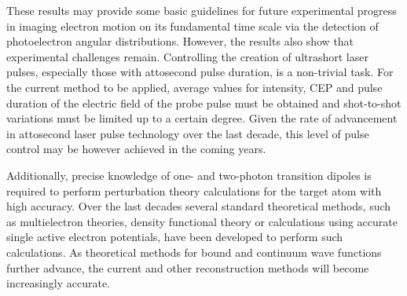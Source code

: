 These results may provide some basic guidelines for future experimental progress in imaging electron motion on its fundamental time scale via the detection of photoelectron angular distributions. However, the results also show that experimental challenges remain. Controlling the creation of ultrashort laser pulses, especially those with attosecond pulse duration, is a non-trivial task. For the current method to be applied, average values for intensity, CEP and pulse duration of the electric field of the probe pulse must be obtained and shot-to-shot variations must be limited up to a certain degree. Given the rate of advancement in attosecond laser pulse technology over the last decade, this level of pulse control may be however achieved in the coming years.


Additionally, precise knowledge of one- and two-photon transition dipoles is required to perform perturbation theory calculations for the target atom with high accuracy. Over the last decades several standard theoretical methods, such as multielectron theories, density functional theory or calculations using accurate single active electron potentials, have been developed to perform such calculations. As theoretical methods for bound and continuum wave functions further advance, the current and other reconstruction methods will become increasingly accurate.

